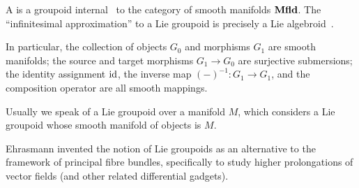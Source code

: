\begin{definition}\label{hda-0009}%
A  is a groupoid internal~ to the
category of smooth manifolds $\mathbf{Mfld}$. The ``infinitesimal
approximation'' to a Lie groupoid is precisely a Lie
algebroid~.

In particular, the collection of objects $G_{0}$ and morphisms $G_{1}$
are smooth manifolds; the source and target morphisms $G_{1}\to G_{0}$ are
surjective submersions; the identity assignment $\operatorname{id}$, the inverse map
$(-)^{-1}\colon G_{1}\to G_{1}$, and the composition operator are all
smooth mappings.

\begin{node}[Remark]\label{hda-000A}%
Usually we speak of a Lie groupoid over a manifold $M$, which considers
a Lie groupoid whose smooth manifold of objects is $M$.
\end{node}

\begin{node}[History]\label{hda-000B}%
Ehrasmann invented the notion of Lie groupoids as an alternative to the
framework of principal fibre bundles, specifically to study higher
prolongations of vector fields (and other related differential gadgets).
\end{node}
\end{definition}

